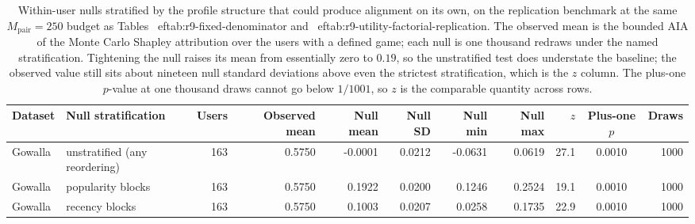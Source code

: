 \begin{table}[!htbp]\centering\scriptsize\setlength{\tabcolsep}{3pt}
\caption{Within-user nulls stratified by the profile structure that could produce alignment on its own, on the replication benchmark at the same $M_{\mathrm{pair}}=250$ budget as Tables~
ef{tab:r9-fixed-denominator} and~
ef{tab:r9-utility-factorial-replication}. The observed mean is the bounded AIA of the Monte Carlo Shapley attribution over the users with a defined game; each null is one thousand redraws under the named stratification. Tightening the null raises its mean from essentially zero to $0.19$, so the unstratified test does understate the baseline; the observed value still sits about nineteen null standard deviations above even the strictest stratification, which is the $z$ column. The plus-one $p$-value at one thousand draws cannot go below $1/1001$, so $z$ is the comparable quantity across rows.}
\label{tab:r9-stratified-null}
\begin{tabular}{@{}llrrrrrrrcr@{}}
\toprule
Dataset & Null stratification & Users & Observed mean & Null mean & Null SD & Null min & Null max & $z$ & Plus-one $p$ & Draws \\
\midrule
Gowalla & unstratified (any reordering) & 163 & 0.5750 & -0.0001 & 0.0212 & -0.0631 & 0.0619 & 27.1 & 0.0010 & 1000 \\
Gowalla & popularity blocks & 163 & 0.5750 & 0.1922 & 0.0200 & 0.1246 & 0.2524 & 19.1 & 0.0010 & 1000 \\
Gowalla & recency blocks & 163 & 0.5750 & 0.1003 & 0.0207 & 0.0258 & 0.1735 & 22.9 & 0.0010 & 1000 \\
\bottomrule
\end{tabular}
\end{table}


